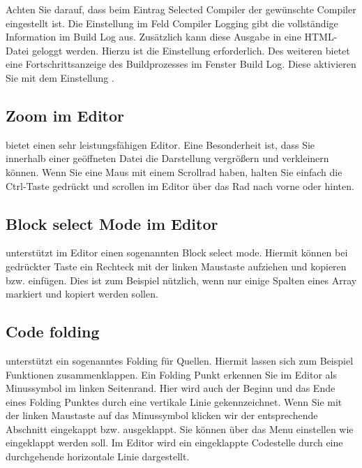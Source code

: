 Achten Sie darauf, dass beim Eintrag Selected Compiler der gewünschte Compiler eingestellt ist. Die Einstellung  im Feld Compiler Logging gibt die vollständige Information im Build Log aus. Zusätzlich kann diese Ausgabe in eine HTML-Datei geloggt werden. Hierzu ist die Einstellung  erforderlich.
Des weiteren bietet \codeblocks eine Fortschrittsanzeige des Buildprozesses im Fenster Build Log. Diese aktivieren Sie mit dem Einstellung .

\subsection{Zoom im Editor}

\codeblocks bietet einen sehr leistungsfähigen Editor. Eine Besonderheit ist, dass Sie innerhalb einer geöffneten Datei die Darstellung vergrößern und verkleinern können. Wenn Sie eine Maus mit einem Scrollrad haben, halten Sie einfach die Ctrl-Taste gedrückt und scrollen im Editor über das Rad nach vorne oder hinten.


\subsection{Block select Mode im Editor}

\codeblocks unterstützt im Editor einen sogenannten Block select mode. Hiermit können bei gedrückter  Taste ein Rechteck mit der linken Maustaste aufziehen und kopieren bzw. einfügen. Dies ist zum Beispiel nützlich, wenn nur einige Spalten eines Array markiert und kopiert werden sollen.


\subsection{Code folding}

\codeblocks unterstützt ein sogenanntes Folding für Quellen. Hiermit lassen sich zum Beispiel Funktionen zusammenklappen. Ein Folding Punkt erkennen Sie im Editor als Minussymbol im linken Seitenrand. Hier wird auch der Beginn und das Ende eines Folding Punktes durch eine vertikale Linie gekennzeichnet. Wenn Sie mit der linken Maustaste auf das Minussymbol klicken wir der entsprechende Abschnitt eingekappt bzw. ausgeklappt. Sie können über das Menu  einstellen wie eingeklappt werden soll. Im Editor wird ein eingeklappte Codestelle durch eine durchgehende horizontale Linie dargestellt.

